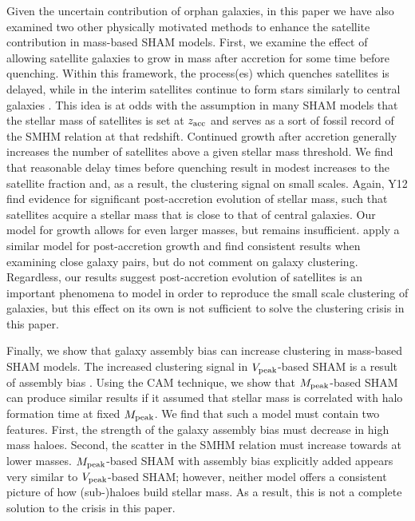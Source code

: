 \documentclass[a4paper,fleqn,usenatbib]{mnras}
\begin{document}
Given the uncertain contribution of orphan galaxies, in this paper we have also examined two other physically motivated methods to enhance the satellite contribution in mass-based SHAM models.  First, we examine the effect of allowing satellite galaxies to grow in mass after accretion for some time before quenching.  Within this framework, the process(es) which quenches satellites is delayed, while in the interim satellites continue to form stars similarly to central galaxies \citep{Wetzel:2013dw}.  This idea is at odds with the assumption in many SHAM models that the stellar mass of satellites is set at $z_{\rm acc}$ and serves as a sort of fossil record of the SMHM relation at that redshift.  Continued growth after accretion generally increases the number of satellites above a given stellar mass threshold.  We find that reasonable delay times before quenching result in modest increases to the satellite fraction and, as a result, the clustering signal on small scales.  Again, Y12 find evidence for significant post-accretion evolution of stellar mass, such that satellites acquire a stellar mass that is close to that of central galaxies.  Our model for growth allows for even larger masses, but remains insufficient.  \citet{Behroozi:2015wx} apply a similar model for post-accretion growth and find consistent results when examining close galaxy pairs, but do not comment on galaxy clustering.  Regardless, our results suggest post-accretion evolution of satellites is an important phenomena to model in order to reproduce the small scale clustering of galaxies, but this effect on its own is not sufficient to solve the clustering crisis in this paper.           

Finally, we show that galaxy assembly bias can increase clustering in mass-based SHAM models.  The increased clustering signal in $V_{\rm peak}$-based SHAM is a result of assembly bias \citep{Zentner:2014ki, Mao:2015fs}.  Using the CAM technique, we show that $M_{\rm peak}$-based SHAM can produce similar results if it assumed that stellar mass is correlated with halo formation time at fixed $M_{\rm peak}$.  We find that such a model must contain two features.  First, the strength of the galaxy assembly bias must decrease in high mass haloes.  Second, the scatter in the SMHM relation must increase towards at lower masses.  $M_{\rm peak}$-based SHAM with assembly bias explicitly added appears very similar to $V_{\rm peak}$-based SHAM; however, neither model offers a consistent picture of how (sub-)haloes build stellar mass.  As a result, this is not a complete solution to the crisis in this paper.   
\end{document}
